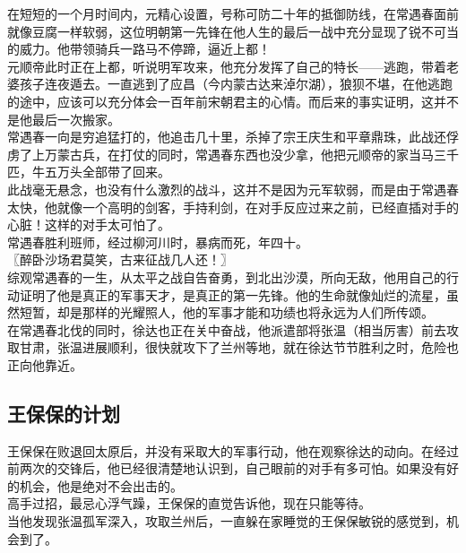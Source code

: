 \begin{multicols}{\theparacolNo}
在短短的一个月时间内，元精心设置，号称可防二十年的抵御防线，在常遇春面前就像豆腐一样软弱，这位明朝第一先锋在他人生的最后一战中充分显现了锐不可当的威力。他带领骑兵一路马不停蹄，逼近上都！\\

元顺帝此时正在上都，听说明军攻来，他充分发挥了自己的特长——逃跑，带着老婆孩子连夜遁去。一直逃到了应昌（今内蒙古达来淖尔湖），狼狈不堪，在他逃跑的途中，应该可以充分体会一百年前宋朝君主的心情。而后来的事实证明，这并不是他最后一次搬家。\\

常遇春一向是穷追猛打的，他追击几十里，杀掉了宗王庆生和平章鼎珠，此战还俘虏了上万蒙古兵，在打仗的同时，常遇春东西也没少拿，他把元顺帝的家当马三千匹，牛五万头全部带了回来。\\

此战毫无悬念，也没有什么激烈的战斗，这并不是因为元军软弱，而是由于常遇春太快，他就像一个高明的剑客，手持利剑，在对手反应过来之前，已经直插对手的心脏！这样的对手太可怕了。\\

常遇春胜利班师，经过柳河川时，暴病而死，年四十。\\

〖醉卧沙场君莫笑，古来征战几人还！〗\\

综观常遇春的一生，从太平之战自告奋勇，到北出沙漠，所向无敌，他用自己的行动证明了他是真正的军事天才，是真正的第一先锋。他的生命就像灿烂的流星，虽然短暂，却是那样的光耀照人，他的军事才能和功绩也将永远为人们所传颂。\\

在常遇春北伐的同时，徐达也正在关中奋战，他派遣部将张温（相当厉害）前去攻取甘肃，张温进展顺利，很快就攻下了兰州等地，就在徐达节节胜利之时，危险也正向他靠近。\\

\subsection{王保保的计划}
王保保在败退回太原后，并没有采取大的军事行动，他在观察徐达的动向。在经过前两次的交锋后，他已经很清楚地认识到，自己眼前的对手有多可怕。如果没有好的机会，他是绝对不会出击的。\\

高手过招，最忌心浮气躁，王保保的直觉告诉他，现在只能等待。\\

当他发现张温孤军深入，攻取兰州后，一直躲在家睡觉的王保保敏锐的感觉到，机会到了。\\


\end{multicols}

